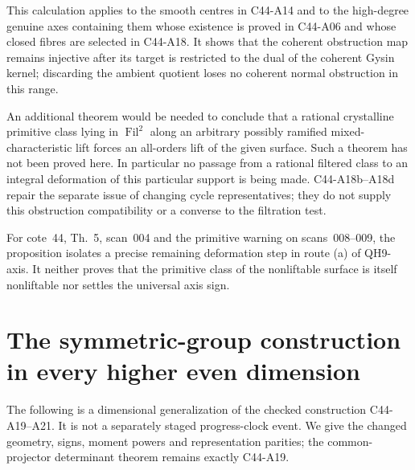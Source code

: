 \documentclass[11pt]{article}
\theoremstyle{remark}\newtheorem{remark}[theorem]{Remark}
\begin{document}
This calculation applies to the smooth centres in C44-A14
and to the high-degree genuine axes containing them whose
existence is proved in C44-A06 and whose closed fibres are
selected in C44-A18. It shows that the coherent obstruction
map remains injective after its target is restricted to the
dual of the coherent Gysin kernel; discarding the ambient
quotient loses no coherent normal obstruction in this range.

An additional theorem would be needed to conclude that a
rational crystalline primitive class lying in
$\operatorname{Fil}^2$ along an arbitrary possibly ramified
mixed-characteristic lift forces an all-orders lift of the
given surface. Such a theorem has not been proved here.
In particular no passage from a rational filtered class to
an integral deformation of this particular support is being
made. C44-A18b--A18d repair the separate issue of changing
cycle representatives; they do not supply this obstruction
compatibility or a converse to the filtration test.

For cote~44, Th.~5, scan~004 and the primitive warning on
scans~008--009, the proposition isolates a precise remaining
deformation step in route (a) of QH9-axis. It neither proves
that the primitive class of the nonliftable surface is itself
nonliftable nor settles the universal axis sign.


\section{The symmetric-group construction in every higher even dimension}
\label{sec:c44-a23}

The following is a dimensional generalization of the checked construction
C44-A19--A21.  It is not a separately staged progress-clock event.  We give
the changed geometry, signs, moment powers and representation parities;
the common-projector determinant theorem remains exactly C44-A19.
\end{document}
